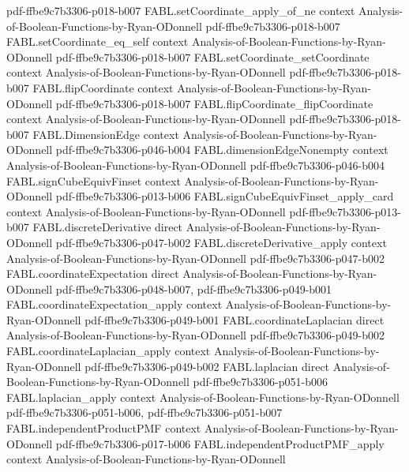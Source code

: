 \begin{theorem}
  {pdf-ffbe9c7b3306-p018-b007}
\proofstep
  {FABL.setCoordinate_apply_of_ne}
  {context}
  {Analysis-of-Boolean-Functions-by-Ryan-ODonnell}
  {pdf-ffbe9c7b3306-p018-b007}
\proofstep
  {FABL.setCoordinate_eq_self}
  {context}
  {Analysis-of-Boolean-Functions-by-Ryan-ODonnell}
  {pdf-ffbe9c7b3306-p018-b007}
\proofstep
  {FABL.setCoordinate_setCoordinate}
  {context}
  {Analysis-of-Boolean-Functions-by-Ryan-ODonnell}
  {pdf-ffbe9c7b3306-p018-b007}
\proofstep
  {FABL.flipCoordinate}
  {context}
  {Analysis-of-Boolean-Functions-by-Ryan-ODonnell}
  {pdf-ffbe9c7b3306-p018-b007}
\proofstep
  {FABL.flipCoordinate_flipCoordinate}
  {context}
  {Analysis-of-Boolean-Functions-by-Ryan-ODonnell}
  {pdf-ffbe9c7b3306-p018-b007}
\proofstep
  {FABL.DimensionEdge}
  {context}
  {Analysis-of-Boolean-Functions-by-Ryan-ODonnell}
  {pdf-ffbe9c7b3306-p046-b004}
\proofstep
  {FABL.dimensionEdgeNonempty}
  {context}
  {Analysis-of-Boolean-Functions-by-Ryan-ODonnell}
  {pdf-ffbe9c7b3306-p046-b004}
\proofstep
  {FABL.signCubeEquivFinset}
  {context}
  {Analysis-of-Boolean-Functions-by-Ryan-ODonnell}
  {pdf-ffbe9c7b3306-p013-b006}
\proofstep
  {FABL.signCubeEquivFinset_apply_card}
  {context}
  {Analysis-of-Boolean-Functions-by-Ryan-ODonnell}
  {pdf-ffbe9c7b3306-p013-b007}
\proofstep
  {FABL.discreteDerivative}
  {direct}
  {Analysis-of-Boolean-Functions-by-Ryan-ODonnell}
  {pdf-ffbe9c7b3306-p047-b002}
\proofstep
  {FABL.discreteDerivative_apply}
  {context}
  {Analysis-of-Boolean-Functions-by-Ryan-ODonnell}
  {pdf-ffbe9c7b3306-p047-b002}
\proofstep
  {FABL.coordinateExpectation}
  {direct}
  {Analysis-of-Boolean-Functions-by-Ryan-ODonnell}
  {pdf-ffbe9c7b3306-p048-b007,
    pdf-ffbe9c7b3306-p049-b001}
\proofstep
  {FABL.coordinateExpectation_apply}
  {context}
  {Analysis-of-Boolean-Functions-by-Ryan-ODonnell}
  {pdf-ffbe9c7b3306-p049-b001}
\proofstep
  {FABL.coordinateLaplacian}
  {direct}
  {Analysis-of-Boolean-Functions-by-Ryan-ODonnell}
  {pdf-ffbe9c7b3306-p049-b002}
\proofstep
  {FABL.coordinateLaplacian_apply}
  {context}
  {Analysis-of-Boolean-Functions-by-Ryan-ODonnell}
  {pdf-ffbe9c7b3306-p049-b002}
\proofstep
  {FABL.laplacian}
  {direct}
  {Analysis-of-Boolean-Functions-by-Ryan-ODonnell}
  {pdf-ffbe9c7b3306-p051-b006}
\proofstep
  {FABL.laplacian_apply}
  {context}
  {Analysis-of-Boolean-Functions-by-Ryan-ODonnell}
  {pdf-ffbe9c7b3306-p051-b006,
    pdf-ffbe9c7b3306-p051-b007}
\proofstep
  {FABL.independentProductPMF}
  {context}
  {Analysis-of-Boolean-Functions-by-Ryan-ODonnell}
  {pdf-ffbe9c7b3306-p017-b006}
\proofstep
  {FABL.independentProductPMF_apply}
  {context}
  {Analysis-of-Boolean-Functions-by-Ryan-ODonnell}

\end{theorem}
